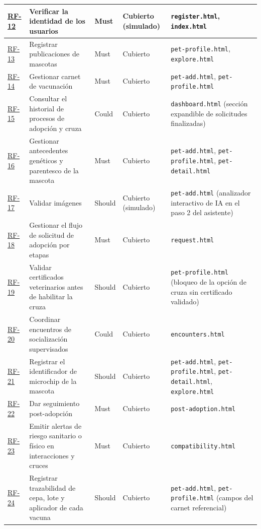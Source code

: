 \documentclass[journal,onecolumn]{IEEEtran}
\begin{document}
\begin{longtable}{@{}p{1.5cm} p{5.2cm} p{1.7cm} p{3.0cm} p{3.4cm}@{}}
		\hline
		\hyperref[tab:RF-12]{RF-12} & Verificar la identidad de los usuarios & Must & Cubierto (simulado) & \texttt{register.html}, \texttt{index.html} \\
		\hline
		\hyperref[tab:RF-13]{RF-13} & Registrar publicaciones de mascotas & Must & Cubierto & \texttt{pet-profile.html}, \texttt{explore.html} \\
		\hline
		\hyperref[tab:RF-14]{RF-14} & Gestionar carnet de vacunación & Must & Cubierto & \texttt{pet-add.html}, \texttt{pet-profile.html} \\
		\hline
		\hyperref[tab:RF-15]{RF-15} & Consultar el historial de procesos de adopción y cruza & Could & Cubierto & \texttt{dashboard.html} (sección expandible de solicitudes finalizadas) \\
		\hline
		\hyperref[tab:RF-16]{RF-16} & Gestionar antecedentes genéticos y parentesco de la mascota & Must & Cubierto & \texttt{pet-add.html}, \texttt{pet-profile.html}, \texttt{pet-detail.html} \\
		\hline
		\hyperref[tab:RF-17]{RF-17} & Validar imágenes & Should & Cubierto (simulado) & \texttt{pet-add.html} (analizador interactivo de IA en el paso 2 del asistente) \\
		\hline
		\hyperref[tab:RF-18]{RF-18} & Gestionar el flujo de solicitud de adopción por etapas & Must & Cubierto & \texttt{request.html} \\
		\hline
		\hyperref[tab:RF-19]{RF-19} & Validar certificados veterinarios antes de habilitar la cruza & Should & Cubierto & \texttt{pet-profile.html} (bloqueo de la opción de cruza sin certificado validado) \\
		\hline
		\hyperref[tab:RF-20]{RF-20} & Coordinar encuentros de socialización supervisados & Could & Cubierto & \texttt{encounters.html} \\
		\hline
		\hyperref[tab:RF-21]{RF-21} & Registrar el identificador de microchip de la mascota & Should & Cubierto & \texttt{pet-add.html}, \texttt{pet-profile.html}, \texttt{pet-detail.html}, \texttt{explore.html} \\
		\hline
		\hyperref[tab:RF-22]{RF-22} & Dar seguimiento post-adopción & Must & Cubierto & \texttt{post-adoption.html} \\
		\hline
		\hyperref[tab:RF-23]{RF-23} & Emitir alertas de riesgo sanitario o físico en interacciones y cruces & Must & Cubierto & \texttt{compatibility.html} \\
		\hline
		\hyperref[tab:RF-24]{RF-24} & Registrar trazabilidad de cepa, lote y aplicador de cada vacuna & Should & Cubierto & \texttt{pet-add.html}, \texttt{pet-profile.html} (campos del carnet referencial) \\

\end{longtable}
\end{document}
